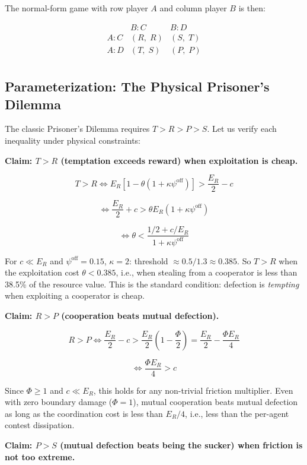 \documentclass[11pt]{article}
\theoremstyle{plain}
\theoremstyle{definition}
\theoremstyle{remark}
\let\origsubsection\subsection
\renewcommand{\subsection}{\needspace{7\baselineskip}\origsubsection}
\begin{document}
The normal-form game with row player \(A\) and column player \(B\) is
then:

\[\begin{array}{c|c|c}
 & B: C & B: D \\ \hline
A: C & (R,\; R) & (S,\; T) \\ \hline
A: D & (T,\; S) & (P,\; P) \\
\end{array}\]

\subsection{Parameterization: The Physical Prisoner's
Dilemma}\label{parameterization-the-physical-prisoners-dilemma}

The classic Prisoner's Dilemma requires \(T > R > P > S\). Let us verify
each inequality under physical constraints:

\textbf{Claim: \(T > R\) (temptation exceeds reward) when exploitation
is cheap.}

\[T > R \iff E_R[1 - \theta(1 + \kappa\psi^{\text{off}})] > \frac{E_R}{2} - c\]

\[\iff \frac{E_R}{2} + c > \theta E_R(1 + \kappa\psi^{\text{off}})\]

\[\iff \theta < \frac{1/2 + c/E_R}{1 + \kappa\psi^{\text{off}}}\]

For \(c \ll E_R\) and \(\psi^{\text{off}} = 0.15\), \(\kappa = 2\):
threshold \(\approx 0.5/1.3 \approx 0.385\). So \(T > R\) when the
exploitation cost \(\theta < 0.385\), i.e., when stealing from a
cooperator is less than 38.5\% of the resource value. This is the
standard condition: defection is \emph{tempting} when exploiting a
cooperator is cheap.

\textbf{Claim: \(R > P\) (cooperation beats mutual defection).}

\[R > P \iff \frac{E_R}{2} - c > \frac{E_R}{2}\left(1 - \frac{\Phi}{2}\right) = \frac{E_R}{2} - \frac{\Phi E_R}{4}\]

\[\iff \frac{\Phi E_R}{4} > c\]

Since \(\Phi \geq 1\) and \(c \ll E_R\), this holds for any non-trivial
friction multiplier. Even with zero boundary damage (\(\Phi = 1\)),
mutual cooperation beats mutual defection as long as the coordination
cost is less than \(E_R/4\), i.e., less than the per-agent contest
dissipation.

\textbf{Claim: \(P > S\) (mutual defection beats being the sucker) when
friction is not too extreme.}
\end{document}
